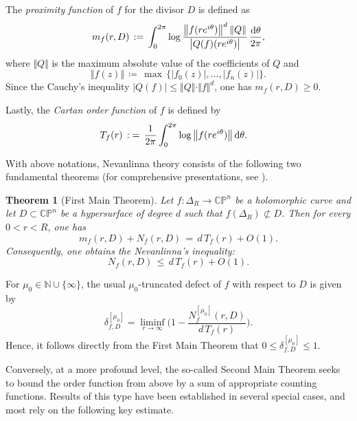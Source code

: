 \documentclass[english, 12pt]{amsart}
\DeclareMathOperator{\dif}{\text{\normalfont d}}
\def\log{\mathrm{log}\,}
\theoremstyle{plain}
\newtheorem{thm}{Theorem}[section]
\theoremstyle{remark}
\numberwithin{equation}{section}
\theoremstyle{plain}
\theoremstyle{named}
\begin{document}
The \textsl{proximity function} of $f$ for the divisor $D$ is defined as
\[
m_f(r,D)
\,
:=
\,
\int_0^{2\pi}
\log
\frac{\big\Vert f(re^{i\theta})\big\Vert^d\,
	\Vert Q\Vert}{\big|Q(f)(re^{i\theta})\big|}
\,
\frac{\dif\!\theta}{2\pi},
\]
where $\Vert Q\Vert$ is the maximum  absolute value of the coefficients of $Q$ and
\[
\big\Vert f(z)\big\Vert
\,
\coloneq
\,
\max
\,
\{|f_0(z)|,\ldots,|f_n(z)|\}.
\]
Since the Cauchy's inequality $\big|Q(f)\big|\leq \Vert Q\Vert\cdot\Vert f\Vert^d$, one has $m_f(r,D)\geq 0$.

Lastly, the \textsl{Cartan order function} of $f$ is defined by
\begin{align*}
	T_f(r)
	\,
	:&=
	\,
	\frac{1}{2\pi}\int_0^{2\pi}
	\log
	\big\Vert f(re^{i\theta})\big\Vert \dif\!\theta.
\end{align*}

With above notations, Nevanlinna theory consists of the following two fundamental theorems (for comprehensive presentations, see  \cite{Noguchi-Winkelmann2014,Ru21}).

\begin{thm}[First Main Theorem]\label{fmt} Let $f\colon\Delta_R\rightarrow \mathbb{C}\mathbb{P}^n$ be a holomorphic curve and let $D\subset \mathbb{C}\mathbb{P}^n$ be a hypersurface of degree $d$ such that $f(\Delta_R)\not\subset D$. Then for every $0<r<R$, one has
	\[
	m_f(r,D)
	+
	N_f(r,D)
	\,
	=
	\,
	d\,T_f(r)
	+
	O(1).
	\]
	Consequently, one obtains the Nevanlinna's inequality:
	\begin{equation}
		\label{-fmt-inequality}
		N_f(r,D)
		\,
		\leq
		\,
		d\,T_f(r)+O(1).
	\end{equation}
\end{thm}
For $\mu_0\in \mathbb{N}\cup\{\infty\}$, the usual $\mu_0$-truncated defect of $f$ with respect to $D$ is given by 
\begin{equation}\label{def-truncated (usual) defect}
	\delta_{f,D}^{[\mu_0]}=\liminf_{r\rightarrow\infty}
	\bigg(
	1-
	\dfrac{N^{[\mu_0]}_f(r,D)}{d\,T_f(r)}
	\bigg).
\end{equation}
Hence, it follows directly from the First Main Theorem that
$
0 \leq \delta_{f,D}^{[\mu_0]}\leq 1.
$

Conversely, at a more profound level, the so-called Second Main Theorem seeks to bound the order function from above by a sum of appropriate counting functions. Results of this type have been established in several special cases, and most rely on the following key estimate.
\end{document}
